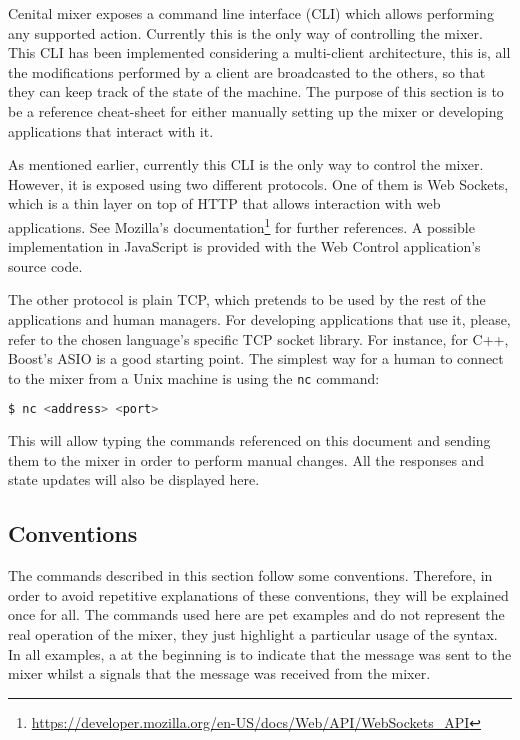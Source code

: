 \documentclass[../main.tex]{subfiles}
\begin{document}
Cenital mixer exposes a command line interface (CLI) which allows performing any supported action. Currently this is the only way of controlling the mixer. This CLI has been implemented considering a multi-client architecture, this is, all the modifications performed by a client are broadcasted to the others, so that they can keep track of the state of the machine. The purpose of this section is to be a reference cheat-sheet for either manually setting up the mixer or developing applications that interact with it.\newline

As mentioned earlier, currently this CLI is the only way to control the mixer. However, it is exposed using two different protocols. One of them is Web Sockets, which is a thin layer on top of HTTP that allows interaction with web applications. See Mozilla's documentation\footnote{\url{https://developer.mozilla.org/en-US/docs/Web/API/WebSockets_API}} for further references. A possible implementation in JavaScript is provided with the Web Control application's source code.\newline

The other protocol is plain TCP, which pretends to be used by the rest of the applications and human managers. For developing applications that use it, please, refer to the chosen language's specific TCP socket library. For instance, for C++, Boost's ASIO is a good starting point. The simplest way for a human to connect to the mixer from a Unix machine is using the \texttt{nc} command:

\begin{lstlisting}[language=bash]
  $ nc <address> <port>
\end{lstlisting}

This will allow typing the commands referenced on this document and sending them to the mixer in order to perform manual changes. All the responses and state updates will also be displayed here.

\subsection{Conventions}

The commands described in this section follow some conventions. Therefore, in order to avoid repetitive explanations of these conventions, they will be explained once for all. The commands used here are pet examples and do not represent the real operation of the mixer, they just highlight a particular usage of the syntax. In all examples, a \textquote{+} at the beginning is to indicate that the message was sent to the mixer whilst a \textquote{-} signals that the message was received from the mixer.\newline
\end{document}
